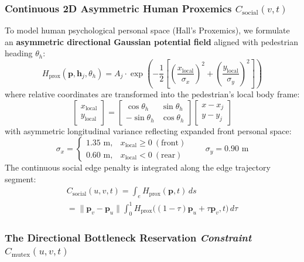\documentclass[journal]{IEEEtran}
\begin{document}
\subsubsection{Continuous 2D Asymmetric Human Proxemics \texorpdfstring{$C_{\text{social}}(v, t)$}{C\_social(v, t)}}
To model human psychological personal space (Hall's Proxemics), we formulate an \textbf{asymmetric directional Gaussian potential field} aligned with pedestrian heading $\theta_h$:
\begin{equation}
H_{\text{prox}}(\mathbf{p}, \mathbf{h}_j, \theta_h) = A_j \cdot \exp\left( -\frac{1}{2} \left[ \left(\frac{x_{\text{local}}}{\sigma_x}\right)^2 + \left(\frac{y_{\text{local}}}{\sigma_y}\right)^2 \right] \right)
\end{equation}
where relative coordinates are transformed into the pedestrian's local body frame:
\begin{equation}
\begin{bmatrix} x_{\text{local}} \\ y_{\text{local}} \end{bmatrix} = \begin{bmatrix} \cos\theta_h & \sin\theta_h \\ -\sin\theta_h & \cos\theta_h \end{bmatrix} \begin{bmatrix} x - x_j \\ y - y_j \end{bmatrix}
\end{equation}
with asymmetric longitudinal variance reflecting expanded front personal space:
\begin{equation}
\sigma_x = \begin{cases} 1.35\text{ m}, & x_{\text{local}} \ge 0 \ (\text{front}) \\ 0.60\text{ m}, & x_{\text{local}} < 0 \ (\text{rear}) \end{cases}
\qquad \sigma_y = 0.90\text{ m}
\end{equation}
The continuous social edge penalty is integrated along the edge trajectory segment:
\begin{multline}
C_{\text{social}}(u, v, t) = \int_{e} H_{\text{prox}}(\mathbf{p}, t)\, ds \\
  = \lVert \mathbf{p}_v - \mathbf{p}_u \rVert
    \int_{0}^{1} H_{\text{prox}}\big((1-\tau)\mathbf{p}_u + \tau \mathbf{p}_v, t\big)\, d\tau
\end{multline}

\subsubsection{The Directional Bottleneck Reservation \emph{Constraint} \texorpdfstring{$C_{\text{mutex}}(u, v, t)$}{C\_mutex(u, v, t)}}
\label{sec:reservation}
\end{document}
